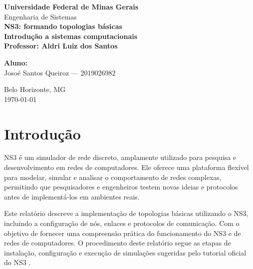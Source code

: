 \documentclass[12pt,a4paper]{article}
\begin{document}

\graphicspath{{../img/}}


\begin{titlepage}
    \centering
    {\Large \textbf{Universidade Federal de Minas Gerais}}\\[0.3cm]
    {\large Engenharia de Sistemas}\\[2cm]

    {\Huge \textbf{NS3: formando topologias básicas}}\\[1.5cm]

    \textbf{Introdução a sistemas computacionais}\\[0.5cm]
    \textbf{Professor: Aldri Luiz dos Santos}\\[1.5cm]
    
    \begin{flushleft}
        \textbf{Aluno:}\\
        Josoé Santos Queiroz --- 2019026982
    \end{flushleft}
    
    \vfill
    {\large Belo Horizonte, MG}\\
    {\large \today}
\end{titlepage}

\clearpage
\tableofcontents
\clearpage

\section{Introdução}

NS3 é um simulador de rede discreto, amplamente utilizado para pesquisa e desenvolvimento em redes de computadores. Ele oferece uma plataforma flexível para modelar, simular e analisar o comportamento de redes complexas, permitindo que pesquisadores e engenheiros testem novas ideias e protocolos antes de implementá-los em ambientes reais.

Este relatório descreve a implementação de topologias básicas utilizando o NS3, incluindo a configuração de nós, enlaces e protocolos de comunicação. Com o objetivo de fornecer uma compreensão prática do funcionamento do NS3 e de redes de  computadores. O procedimento deste relatório segue as etapas de instalação, configuração e execução de simulações sugeridas pelo tutorial oficial do NS3 \cite{ns3_tutorial}.
\end{document}
